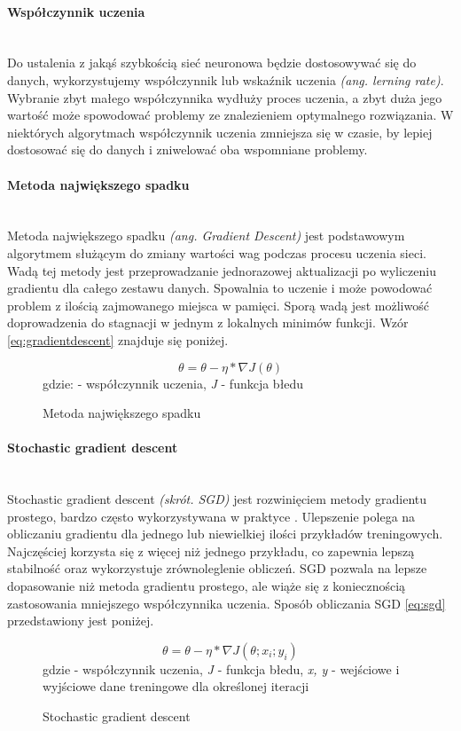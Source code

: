 \paragraph{Współczynnik uczenia} \mbox{}\\
Do ustalenia z jakąś szybkością sieć neuronowa będzie dostosowywać się do danych, wykorzystujemy
współczynnik lub wskaźnik uczenia \textit{(ang. lerning rate)}. Wybranie zbyt małego
współczynnika wydłuży proces uczenia, a zbyt duża jego wartość może spowodować problemy
ze znalezieniem optymalnego rozwiązania. W niektórych algorytmach współczynnik uczenia
zmniejsza się w czasie, by lepiej dostosować się do danych i zniwelować oba wspomniane problemy.

\paragraph{Metoda największego spadku} \mbox{}\\
Metoda największego spadku \textit{(ang. Gradient Descent)} jest podstawowym algorytmem
służącym do zmiany wartości wag podczas procesu uczenia sieci.
Wadą tej metody jest przeprowadzanie jednorazowej aktualizacji po wyliczeniu gradientu dla
całego zestawu danych. Spowalnia to uczenie i może powodować problem z ilością zajmowanego
miejsca w pamięci. Sporą wadą jest możliwość doprowadzenia do stagnacji w jednym z
lokalnych minimów funkcji. Wzór \ref{eq:gradientdescent} znajduje się poniżej.
\begin{figure}[h!]
\renewcommand{\figurename}{Wzór}%
\begin{equation} \label{eq:gradientdescent}
\theta = \theta - \eta * \nabla J(\theta)
\end{equation}
\centering
gdzie: \texteta - współczynnik uczenia, \textit{J} - funkcja błedu
\caption{Metoda największego spadku}
\end{figure}

\paragraph{Stochastic gradient descent} \mbox{}\\
Stochastic gradient descent \textit{(skrót. SGD)} jest rozwinięciem metody gradientu
prostego, bardzo często wykorzystywana w praktyce \cite{OptimizersOverview}.
Ulepszenie polega na obliczaniu gradientu dla jednego lub niewielkiej ilości przykładów
treningowych. Najczęściej korzysta się z więcej niż jednego przykładu, co zapewnia
lepszą stabilność oraz wykorzystuje zrównoleglenie obliczeń. SGD pozwala na lepsze dopasowanie
niż metoda gradientu prostego, ale wiąże się z koniecznością zastosowania mniejszego
współczynnika uczenia. Sposób obliczania SGD \ref{eq:sgd} przedstawiony jest poniżej.
\begin{figure}[h!]
\renewcommand{\figurename}{Wzór}%
\begin{equation} \label{eq:sgd}
\theta = \theta - \eta * \nabla J(\theta; x_i; y_i)
\end{equation}
\centering
gdzie \texteta - współczynnik uczenia, \textit{J} - funkcja błedu,
\textit{x, y} - wejściowe i wyjściowe dane treningowe dla określonej iteracji
\caption{Stochastic gradient descent}
\end{figure}

